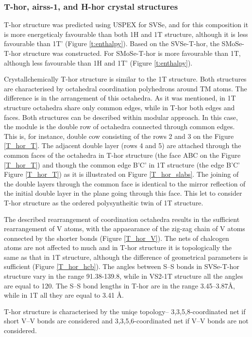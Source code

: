 \documentclass[a4paperm]{article}
\begin{document}
\subsubsection{T-hor, airss-1, and H-hor crystal structures}
T-hor structure was predicted using USPEX for SVSe, and for this composition it is more  energeticaly favourable than both 1H and 1T structure, although it is less favourable than 1T' (Figure \ref{t:enthalpy}).
Based on the SVSe-T-hor, the SMoSe-T-hor structure was constructed.
For SMoSe-T-hor is more favourable than 1T, although less favourable than 1H and 1T' (Figure \ref{t:enthalpy}).

Crystallchemically T-hor structure is similar to the 1T structure.
Both structures are characterised by octahedral coordination polyhedrons around TM atoms.
The difference is in the arrangement of this octahedra.
As it was mentioned, in 1T structure octahedra share only common edges, while in T-hor both edges and faces.
Both structures can be described within modular approach.
In this case, the module is the double row of octahedra connected through common edges.
This is, for instance, double cow consisting of the rows 2 and 3 on the Figure \ref{T_hor_T}.
The adjacent double layer (rows 4 and 5) are attached through the common faces  of the octahedra in T-hor structure (the face ABC on the Figure \ref{T_hor_T}) and though the common edge B'C' in 1T structure (the edge B'C' Figure \ref{T_hor_T}) as it is illustrated on Figure \ref{T_hor_slabs}.
The joining of the double layers through the common face is identical to the mirror reflection of the initial double layer in the plane going through this face.
This let to consider T-hor structure as the ordered polysyntheitic twin of 1T structure.

The described rearrangement of coordination octahedra results in the sufficient rearrangement of V atoms, with the appaearance of the zig-zag chain of V atoms connected by the shorter bonds (Figure \ref{T_hor_V}).
The nets of chalcogen atoms are not affected to much and in T-hor structure it is topologically the same as that in 1T structure, although the difference of geometrical parameters is sufficient (Figure \ref{T_hor_hcb}).
The angles between S--S bonds in SVSe-T-hor structure vary in the range 91.38-139.8\textdegree, while in VS2-1T structure all the angles are equal to 120\textdegree.
The S--S bond lengths in T-hor are in the range 3.45--3.87\AA, while in 1T all they are equal to 3.41 \AA.

T-hor structure is characterised by the uniqe topology– 3,3,5,8-coordinated net if short V--V bonds are considered and 3,3,5,6-coordinated net if V--V bonds are not considered.
\end{document}
